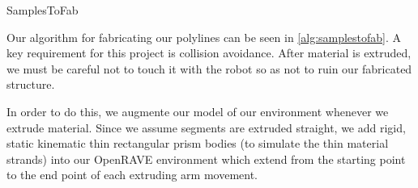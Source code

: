 \documentclass[conference]{acmsiggraph}
\makeatletter
\def\BState{\State\hskip-\ALG@thistlm}
\makeatother
\begin{document}
\begin{algorithm}
\caption{SamplesToFab}\label{alg:samplestofab}
\end{algorithm}


Our algorithm for fabricating our polylines can be seen in \ref{alg:samplestofab}.  A key requirement for this project is collision avoidance.  After material is extruded, we must be careful not to touch it with the robot so as not to ruin our fabricated structure.

In order to do this, we augmente our model of our environment whenever we extrude material.  Since we assume segments are extruded straight, we add rigid, static kinematic thin rectangular prism bodies (to simulate the thin material strands) into our OpenRAVE environment which extend from the starting point to the end point of each extruding arm movement.
\end{document}
